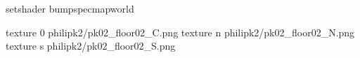 setshader bumpspecmapworld

texture 0 philipk2/pk02_floor02_C.png
texture n philipk2/pk02_floor02_N.png
texture s philipk2/pk02_floor02_S.png

